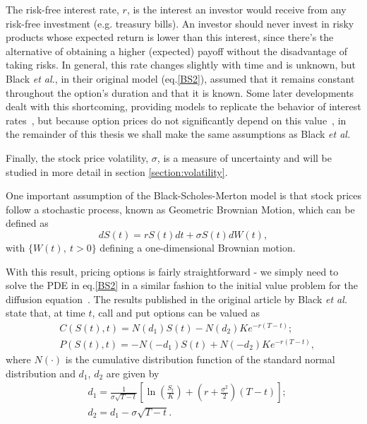 The risk-free interest rate, $r$, is the interest an investor would receive from any risk-free investment (e.g. treasury bills). An investor should never invest in risky products whose expected return is lower than this interest, since there's the alternative of obtaining a higher (expected) payoff without the disadvantage of taking risks. In general, this rate changes slightly with time and is unknown, but Black \textit{et al.}, in their original model (eq.\eqref{BS2}), assumed that it remains constant throughout the option's duration and that it is known. Some later developments dealt with this shortcoming, providing models to replicate the behavior of interest rates~\cite{HJM}, but because option prices do not significantly depend on this value~\cite{Wilmott3}, in the remainder of this thesis we shall make the same assumptions as Black \textit{et al.}

Finally, the stock price volatility, $\sigma$, is a measure of uncertainty and will be studied in more detail in section \ref{section:volatility}.

One important assumption of the Black-Scholes-Merton model is that stock prices follow a stochastic process, known as Geometric Brownian Motion, which can be defined as
\begin{equation}\label{GBM}
dS(t)=rS(t)dt+\sigma S(t)dW(t),
\end{equation}
\noindent with $\{W(t),\ t>0\}$ defining a one-dimensional Brownian motion.


With this result, pricing options is fairly straightforward - we simply need to solve the PDE in eq.\eqref{BS2} in a similar fashion to the initial value problem for the diffusion equation~\cite{Dilao}.
The results published in the original article by Black \textit{et al.} state that, at time $t$, call and put options can be valued as
\begin{equation}\label{callputBS}
\begin{split}
&C(S(t),t)=N(d_1)S(t)-N(d_2)Ke^{-r(T-t)};\\
&P(S(t),t)=-N(-d_1)S(t)+N(-d_2)Ke^{-r(T-t)},
\end{split}
\end{equation}
\noindent where $N(\cdot)$ is the cumulative distribution function of the standard normal distribution and $d_1$, $d_2$ are given by
\begin{equation}\label{d1d2}
\begin{split}
&d_1=\frac{1}{\sigma\sqrt{T-t}}\left[\ln\left(\frac{S_t}{K}\right)+\left(r+\frac{\sigma^2}{2}\right)(T - t)\right];\\
&d_2=d_1-\sigma\sqrt{T-t}.\\
\end{split}
\end{equation}



